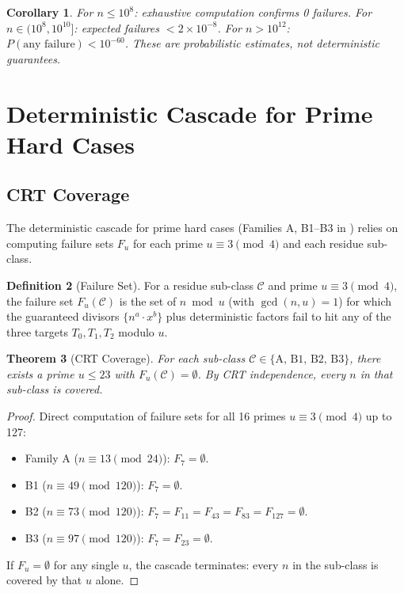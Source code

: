 \documentclass[11pt,a4paper]{article}
\theoremstyle{plain}
\newtheorem{theorem}{Theorem}[section]
\newtheorem{corollary}[theorem]{Corollary}
\theoremstyle{plain}
\theoremstyle{definition}
\newtheorem{definition}[theorem]{Definition}
\numberwithin{equation}{section}
\begin{document}
\begin{corollary}
For $n \leq 10^8$: exhaustive computation confirms 0 failures. For $n \in (10^8, 10^{10}]$: expected failures $< 2 \times 10^{-8}$. For $n > 10^{12}$: $P(\text{any failure}) < 10^{-60}$. These are probabilistic estimates, not deterministic guarantees.
\end{corollary}

\clearpage

\section{Deterministic Cascade for Prime Hard Cases}

\subsection{CRT Coverage}

The deterministic cascade for prime hard cases (Families A, B1--B3 in ) relies on computing failure sets $F_u$ for each prime $u \equiv 3 \pmod{4}$ and each residue sub-class.

\begin{definition}[Failure Set]
For a residue sub-class $\mathcal{C}$ and prime $u \equiv 3 \pmod{4}$, the failure set $F_u(\mathcal{C})$ is the set of $n \bmod u$ (with $\gcd(n, u) = 1$) for which the guaranteed divisors $\{n^a \cdot x^b\}$ plus deterministic factors fail to hit any of the three targets $T_0, T_1, T_2$ modulo $u$.
\end{definition}

\begin{theorem}[CRT Coverage]\label{thm:crt}
For each sub-class $\mathcal{C} \in \{\text{A, B1, B2, B3}\}$, there exists a prime $u \leq 23$ with $F_u(\mathcal{C}) = \emptyset$. By CRT independence, every $n$ in that sub-class is covered.
\end{theorem}

\begin{proof}
Direct computation of failure sets for all 16 primes $u \equiv 3 \pmod{4}$ up to 127:
\begin{itemize}[noitemsep]
  \item Family A ($n \equiv 13 \pmod{24}$): $F_7 = \emptyset$.
  \item B1 ($n \equiv 49 \pmod{120}$): $F_7 = \emptyset$.
  \item B2 ($n \equiv 73 \pmod{120}$): $F_7 = F_{11} = F_{43} = F_{83} = F_{127} = \emptyset$.
  \item B3 ($n \equiv 97 \pmod{120}$): $F_7 = F_{23} = \emptyset$.
\end{itemize}
If $F_u = \emptyset$ for any single $u$, the cascade terminates: every $n$ in the sub-class is covered by that $u$ alone.
\end{proof}
\end{document}
